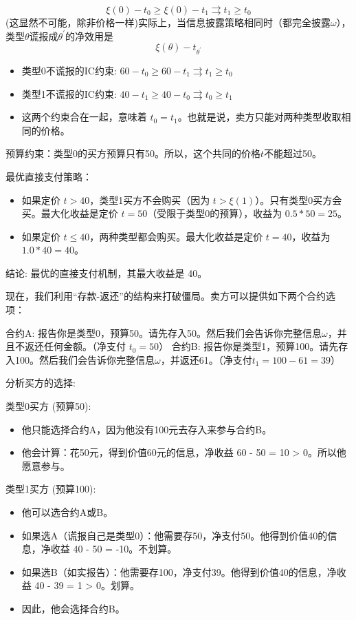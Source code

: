 $$\xi(0) - t_0 \geq \xi(0) - t_1 \rightrightarrows t_1\geq t_0$$
(这显然不可能，除非价格一样)实际上，当信息披露策略相同时（都完全披露$\omega$），类型$\theta$谎报成$\theta^\prime$的净效用是
$$\xi(\theta)-t_{\theta^\prime}$$

\begin{itemize}
    \item 类型0不谎报的IC约束: $60 - t_0 \geq 60 - t_1 \rightrightarrows t_1 \geq t_0$
    \item 类型1不谎报的IC约束: $40 - t_1 \geq 40 - t_0 \rightrightarrows t_0 \geq t_1$
    \item 这两个约束合在一起，意味着 $t_0 = t_1$。也就是说，卖方只能对两种类型收取相同的价格。
\end{itemize}

预算约束：类型0的买方预算只有50。所以，这个共同的价格$t$不能超过50。

最优直接支付策略：
\begin{itemize}
    \item 如果定价 $t > 40$，类型1买方不会购买（因为 $t > \xi(1)$）。只有类型0买方会买。最大化收益是定价 $t=50$（受限于类型0的预算），收益为 $0.5 * 50 = 25$。
    \item 如果定价 $t \leq 40$，两种类型都会购买。最大化收益是定价 $t=40$，收益为 $1.0 * 40 = 40$。
\end{itemize}

结论: 最优的直接支付机制，其最大收益是 40。

现在，我们利用“存款-返还”的结构来打破僵局。卖方可以提供如下两个合约选项：

合约A: 报告你是类型0，预算50。请先存入50。然后我们会告诉你完整信息$\omega$，并且不返还任何金额。（净支付 $t_0 = 50$）
合约B: 报告你是类型1，预算100。请先存入100。然后我们会告诉你完整信息$\omega$，并返还61。（净支付$t_1 = 100 - 61 = 39$）

分析买方的选择:

类型0买方 (预算50):
\begin{itemize}
    \item 他只能选择合约A，因为他没有100元去存入来参与合约B。
    \item 他会计算：花50元，得到价值60元的信息，净收益 60 - 50 = 10 > 0。所以他愿意参与。
\end{itemize}

类型1买方 (预算100):
\begin{itemize}
    \item 他可以选合约A或B。
    \item 如果选A（谎报自己是类型0）：他需要存50，净支付50。他得到价值40的信息，净收益 40 - 50 = -10。不划算。
    \item 如果选B（如实报告）：他需要存100，净支付39。他得到价值40的信息，净收益 40 - 39 = 1 > 0。划算。
    \item 因此，他会选择合约B。
\end{itemize}


